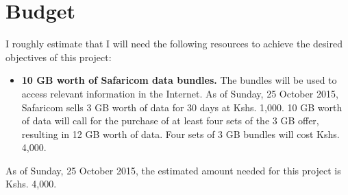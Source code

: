 \documentclass[12pt,svgnames,smaller]{article} %
\newenvironment{xitemize}
	{\begin{minipage}[t]{0.5\textwidth}\begin{itemize}}
	{\end{itemize}\end{minipage}}
\begin{document}
%			
%
%			



\section{ \textbf{ Budget } } 

I roughly estimate that I will need the following resources to achieve the desired objectives of this project:

\begin{itemize}
	\item \textbf{10 GB worth of Safaricom data bundles.} The bundles will be used to access relevant information in the Internet. As of Sunday, 25 October 2015, Safaricom sells 3 GB worth of data for 30 days at Kshs. 1,000. 10 GB worth of data will call for the purchase of at least four sets of the 3 GB offer, resulting in 12 GB worth of data. Four sets of 3 GB bundles will cost Kshs. 4,000.
\end{itemize}

As of Sunday, 25 October 2015, the estimated amount needed for this project is Kshs. 4,000.

\end{document}
